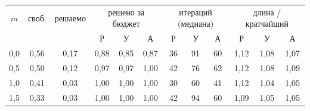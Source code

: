 \begin{tabular}{ccc|ccc|ccc|ccc}
\toprule
$m$ & своб. & решаемо & \multicolumn{3}{c|}{решено за бюджет} & \multicolumn{3}{c|}{итераций (медиана)} & \multicolumn{3}{c}{длина / кратчайший} \\
 & & & Р & У & А & Р & У & А & Р & У & А \\
\midrule
0{,}0 & 0{,}56 & 0{,}17 & 0{,}88 & 0{,}85 & 0{,}87 & 36 & 91 & 60 & 1{,}12 & 1{,}08 & 1{,}07 \\
0{,}5 & 0{,}50 & 0{,}12 & 0{,}97 & 0{,}97 & 1{,}00 & 42 & 76 & 62 & 1{,}12 & 1{,}08 & 1{,}09 \\
1{,}0 & 0{,}41 & 0{,}03 & 1{,}00 & 1{,}00 & 1{,}00 & 30 & 60 & 41 & 1{,}12 & 1{,}04 & 1{,}05 \\
1{,}5 & 0{,}33 & 0{,}03 & 1{,}00 & 1{,}00 & 1{,}00 & 42 & 94 & 60 & 1{,}09 & 1{,}05 & 1{,}05 \\
\bottomrule
\end{tabular}
